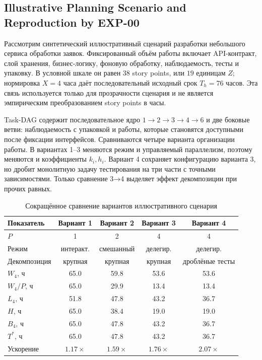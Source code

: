 \subsection{Illustrative Planning Scenario and Reproduction by EXP-00}
\label{sec:practical-example}

Рассмотрим синтетический иллюстративный сценарий разработки небольшого сервиса
обработки заявок. Фиксированный
объём работы включает API-контракт, слой хранения, бизнес-логику, фоновую
обработку, наблюдаемость, тесты и упаковку. В условной шкале он равен
$38$ story points, или $19$ единицам $Z$; нормировка $X=4$ часа даёт
последовательный исходный срок $T_h=76$ часов. Эта связь используется только
для прозрачности сценария и не является эмпирическим преобразованием story
points в часы.

Task-DAG содержит последовательное ядро
$1\to2\to3\to4\to6$ и две боковые ветви: наблюдаемость с упаковкой и работы,
которые становятся доступными после фиксации интерфейсов. Сравниваются четыре
варианта организации работы. В вариантах 1--3 меняются режим и управляемый
параллелизм, поэтому меняются и коэффициенты $k_i,h_i$. Вариант 4 сохраняет
конфигурацию варианта 3, но дробит монолитную задачу тестирования на три части
с точными зависимостями. Только сравнение 3→4 выделяет эффект декомпозиции при
прочих равных.

\begin{table}[ht]
\centering
\caption{Сокращённое сравнение вариантов иллюстративного сценария}
\label{tab:compact-practical}
\begin{tabular}{lcccc}
\toprule
Показатель & Вариант 1 & Вариант 2 & Вариант 3 & Вариант 4 \\
\midrule
$P$ & 1 & 2 & 4 & 4 \\
Режим & интеракт. & смешанный & делегир. & делегир. \\
Декомпозиция & крупная & крупная & крупная & дроблёные тесты \\
$W_4$, ч & 65.0 & 59.8 & 53.6 & 53.6 \\
$W_4/P$, ч & 65.0 & 29.9 & 13.4 & 13.4 \\
$L_4$, ч & 51.8 & 47.8 & 43.2 & 36.7 \\
$H$, ч & 65.0 & 38.4 & 19.0 & 19.0 \\
$B_4$, ч & 65.0 & 47.8 & 43.2 & 36.7 \\
$T^*$, ч & 65.0 & 47.8 & 43.2 & 36.7 \\
Ускорение & $1.17\times$ & $1.59\times$ & $1.76\times$ & $2.07\times$ \\
\bottomrule
\end{tabular}
\end{table}

